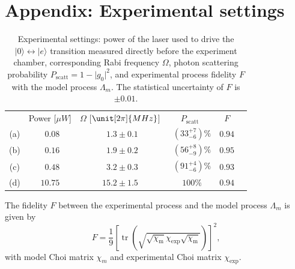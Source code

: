 \documentclass[
aps,prl,
reprint,
a4paper,
superscriptaddress,
floatfix,
]{revtex4-1}
\DeclareMathOperator{\tr}{tr}
\newcommand{\N}{{\phantom{0}}}
\newcommand{\abs}[1]{{\lvert{#1}\rvert}}
\begin{document}
\section{Appendix: Experimental settings}
\begin{table}[h]                                                                                                                                                                                                                                                                                                                                                                                                                                                                                             
\centering
\begin{ruledtabular}
\begin{tabular}{cccccc}
 & Power [$\unit{\mu W}$] & $\Omega$ [$\unit[2\pi]{MHz}$]
 & $P_\mathrm{scatt}$ &  $F$ \\
\colrule
(a) & $\N0.08$ & $\N1.3 \pm 0.1$ & $\N\left(33^{+7}_{-6}\right)\%$ & $0.94$ \\
(b) & $\N0.16$ & $\N1.9 \pm 0.2$ & $\N\left(56^{+8}_{-9}\right)\%$ & $0.95$ \\
(c) & $\N0.48$ & $\N3.2 \pm 0.3$ & $\N\left(91^{+4}_{-6}\right)\%$ & $0.93$ \\
(d) & $ 10.75$ & $ 15.2 \pm 1.5$ & $ \N100\%$ & $0.94$ \\
\end{tabular}
\end{ruledtabular}
\caption{\label{tab:results}%
Experimental settings: power of the laser used to drive the $|0\rangle \leftrightarrow |e\rangle$ transition measured directly before the experiment chamber, corresponding Rabi 
 frequency $\Omega$, photon scattering probability $P_\mathrm{scatt}= 1-\abs{g_0}^2$,
 and experimental process fidelity $F$ 
 with the model process $\Lambda_m$.
The statistical uncertainty of $F$ is $\pm0.01$.}
\end{table}

The fidelity $F$ between the experimental process and the model process $\Lambda_m$ is given by
\begin{equation}
F= \frac19\left[\tr\left(\sqrt{ \sqrt{\chi_\mathrm{m}}
 \chi_\mathrm{exp} \sqrt{\chi_\mathrm{m}}}\right)\right]^2,
\label{eq:fidelity}
\end{equation}
with model Choi matrix $\chi_m$ and experimental Choi matrix $\chi_{\text{exp}}$.
\end{document}
